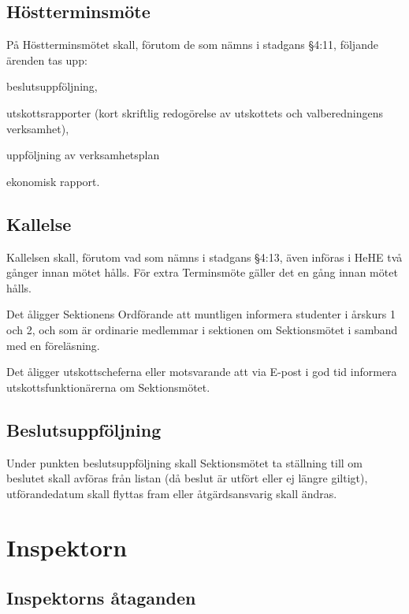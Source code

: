 \documentclass[10pt]{article}
\begin{document}
\subsection{Höstterminsmöte}

På Höstterminsmötet skall, förutom de som nämns i stadgans §4:11,
följande ärenden tas upp:
\begin{alphlist}
    \item beslutsuppföljning,
    \item utskottsrapporter (kort skriftlig redogörelse av utskottets och
        valberedningens verksamhet),
   	\item uppföljning av verksamhetsplan
    \item ekonomisk rapport.
\end{alphlist}

\subsection{Kallelse}

Kallelsen skall, förutom vad som nämns i stadgans §4:13, även införas i
HeHE två gånger innan mötet hålls. För extra Terminsmöte gäller det en
gång innan mötet hålls.

Det åligger Sektionens Ordförande att muntligen informera studenter i årskurs 1 och 2, och som är ordinarie medlemmar i sektionen om
Sektionsmötet i samband med en föreläsning.

Det åligger utskottscheferna eller motsvarande att via E-post i god tid
informera utskottsfunktionärerna om Sektionsmötet.

\subsection{Beslutsuppföljning}

Under punkten beslutsuppföljning skall Sektionsmötet ta ställning till om
beslutet skall avföras från listan (då beslut är utfört eller ej längre
giltigt), utförandedatum skall flyttas fram eller åtgärdsansvarig skall ändras.

\section{Inspektorn}

\subsection{Inspektorns åtaganden}
\end{document}
